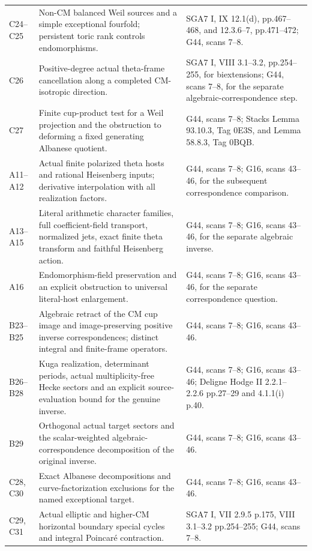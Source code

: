 \begin{longtable}{@{}p{.18\linewidth}p{.48\linewidth}p{.27\linewidth}@{}}
C24--C25 & Non-CM balanced Weil sources and a simple exceptional fourfold; persistent toric rank controls endomorphisms. & SGA7 I, IX 12.1(d), pp.467--468, and 12.3.6--7, pp.471--472; G44, scans 7--8.\\
C26 & Positive-degree actual theta-frame cancellation along a completed CM-isotropic direction. & SGA7 I, VIII 3.1--3.2, pp.254--255, for biextensions; G44, scans 7--8, for the separate algebraic-correspondence step.\\
C27 & Finite cup-product test for a Weil projection and the obstruction to deforming a fixed generating Albanese quotient. & G44, scans 7--8; Stacks Lemma 93.10.3, Tag 0E3S, and Lemma 58.8.3, Tag 0BQB.\\
A11--A12 & Actual finite polarized theta hosts and rational Heisenberg inputs; derivative interpolation with all realization factors. & G44, scans 7--8; G16, scans 43--46, for the subsequent correspondence comparison.\\
A13--A15 & Literal arithmetic character families, full coefficient-field transport, normalized jets, exact finite theta transform and faithful Heisenberg action. & G44, scans 7--8; G16, scans 43--46, for the separate algebraic inverse.\\
A16 & Endomorphism-field preservation and an explicit obstruction to universal literal-host enlargement. & G44, scans 7--8; G16, scans 43--46, for the separate correspondence question.\\
B23--B25 & Algebraic retract of the CM cup image and image-preserving positive inverse correspondences; distinct integral and finite-frame operators. & G44, scans 7--8; G16, scans 43--46.\\
B26--B28 & Kuga realization, determinant periods, actual multiplicity-free Hecke sectors and an explicit source-evaluation bound for the genuine inverse. & G44, scans 7--8; G16, scans 43--46; Deligne Hodge II 2.2.1--2.2.6 pp.27--29 and 4.1.1(i) p.40.\\
B29 & Orthogonal actual target sectors and the scalar-weighted algebraic-correspondence decomposition of the original inverse. & G44, scans 7--8; G16, scans 43--46.\\
C28, C30 & Exact Albanese decompositions and curve-factorization exclusions for the named exceptional target. & G44, scans 7--8; G16, scans 43--46.\\
C29, C31 & Actual elliptic and higher-CM horizontal boundary special cycles and integral Poincar\'e contraction. & SGA7 I, VII 2.9.5 p.175, VIII 3.1--3.2 pp.254--255; G44, scans 7--8.\\

\end{longtable}

